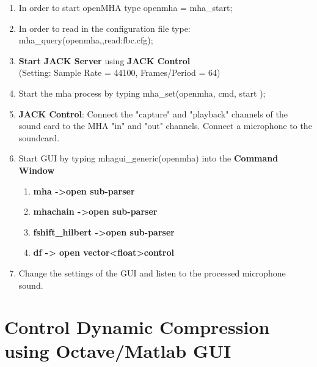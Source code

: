 \documentclass[11pt,a4paper,twoside]{article}
\newcommand{\+}{\discretionary{\mbox{\scriptsize$\hookleftarrow$}}{}{}}
\begin{document}
{{\begin{enumerate}
\item In order to start openMHA type {\ttfamily openmha = mha\_start;} 
\item In order to read in the configuration file type: \\ {\ttfamily mha\_query(openmha,\textquotesingle{}\textquotesingle{},\textquotesingle{}read:fbc.cfg\textquotesingle{});}
\item \textbf{Start JACK Server} using \textbf{JACK Control}\\ (Setting: Sample Rate = 44100, Frames/Period = 64)
\item Start the mha process by typing {\ttfamily mha\_set(openmha, \textquotesingle{}cmd\textquotesingle{}, \textquotesingle{}start\textquotesingle{} );}
\item \textbf{JACK Control}: Connect the "capture" and "playback" channels
  of the sound card to the MHA "in" and "out" channels.
  Connect a microphone to the soundcard.
\item Start GUI by typing {\ttfamily mhagui\_generic(openmha)} into the \textbf{Command Window}
\begin{enumerate}
\item \textbf{mha ->open sub-parser}
\item \textbf{mhachain ->open sub-parser}
\item \textbf{fshift\_hilbert ->open sub-parser}
\item \textbf{df -> open vector<float>control}
\end{enumerate}
\item Change the settings of the GUI and listen to the processed microphone sound.
\end{enumerate}

\newpage

\section{Control Dynamic Compression using Octave/Matlab GUI}

}}
\end{document}
